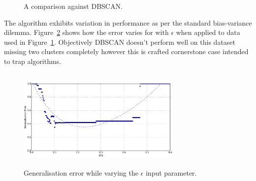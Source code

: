 \documentclass{ecsarticle}     %
\begin{document}
\begin{figure}[ht]
   \centering
   \caption{A comparison against DBSCAN.}
   \label{fig:compare}
\end{figure}

The algorithm exhibits variation in performance as per the standard bias-variance dilemma.
Figure~\ref{fig:error} shows how the error varies for with $\epsilon$ when applied to data used in Figure~\ref{fig:compare}.
Objectively DBSCAN doesn't perform well on this dataset missing two clusters completely however this is crafted cornerstone case intended to trap algorithms.

\begin{figure}[ht]
   \centering
    \includegraphics[height = 5cm,width = 8cm]{error.pdf}
   \caption{Generalisation error while varying the $\epsilon$ input parameter.}
   \label{fig:error}
\end{figure}
\end{document}
